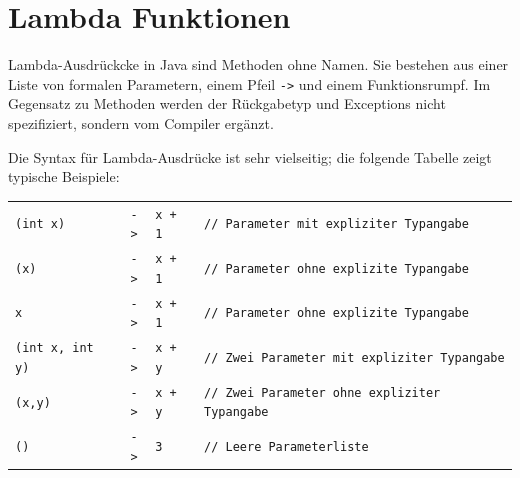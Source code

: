 \section{Lambda Funktionen}
\label{sec:lambda}

Lambda-Ausdrückcke in Java sind Methoden ohne Namen. Sie bestehen aus einer Liste
von formalen Parametern, einem Pfeil \texttt{->} und einem Funktionsrumpf.
Im Gegensatz zu Methoden werden der Rückgabetyp und Exceptions nicht spezifiziert,
sondern vom Compiler ergänzt.

Die Syntax für Lambda-Ausdrücke ist sehr vielseitig; die folgende Tabelle zeigt
typische Beispiele:

\begin{table}[ht]
    \begin{center}
        \begin{tabular}{p{3cm}cll}

            \texttt{(int x)}        & \texttt{->} & \texttt{x + 1} & \texttt{// Parameter mit expliziter Typangabe} \\
            \texttt{(x)}            & \texttt{->} & \texttt{x + 1} & \texttt{// Parameter ohne explizite Typangabe} \\
            \texttt{x}              & \texttt{->} & \texttt{x + 1} & \texttt{// Parameter ohne explizite Typangabe} \\
            \texttt{(int x, int y)} & \texttt{->} & \texttt{x + y} & \texttt{// Zwei Parameter mit expliziter Typangabe} \\
            \texttt{(x,y)}          & \texttt{->} & \texttt{x + y} & \texttt{// Zwei Parameter ohne expliziter Typangabe} \\
            \texttt{()}             & \texttt{->} & \texttt{3}     & \texttt{// Leere Parameterliste} \\

        \end{tabular}
    \end{center}
    \label{tab:lambda-examples}
\end{table}


